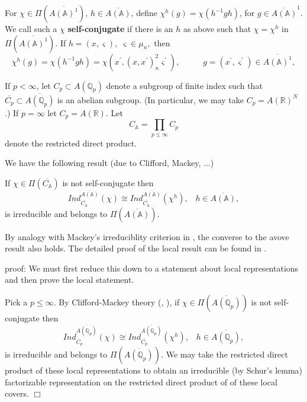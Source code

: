 For $\chi \in \Pi (\overline{A({\mathbb{A}})^1})$,
$h\in \overline{A({\mathbb{A}})}$, define
$\chi ^h(g)=\chi (h^{-1}gh)$, for $g\in 
\overline{A({\mathbb{A}})}^1$. We call such a
$\chi $ \textbf{self-conjugate} if
there is an $h$ as above such that $\chi =\chi ^h$
in $\Pi (\overline{A({\mathbb{A}})^1})$.
If $h=(x,\varsigma ),\;\varsigma \in \mu _n,$ then 
\[
\chi ^h(g)=\chi (h^{-1}gh)
=\chi (x^{\prime },(x,x^{\prime })_n^2\varsigma^{\prime }),
\;\;\;\;\;\;\;\;\;\;g=(x^{\prime },
\varsigma ^{\prime })\in \overline{A({\mathbb{A}})^1},
\]

If $p<\infty$, let $C_p\subset A({\mathbb{Q}}_p)$ denote a subgroup
of finite index such that
$\overline{C_p}\subset \overline{A({\mathbb{Q}}_p)}$ is
an abelian subgroup. (In particular, we may take
$C_p=A({\mathbb{R}})^N$.) If $p=\infty$ let $C_p=A({\mathbb{R}})$. Let
\begin{equation}\label{eq:3.7}
C_{{\mathbb{A}}}=\prod_{p\leq \infty }C_p
\end{equation}
denote the restricted direct product.

We have the following result (due to Clifford, Mackey,
...)

\begin{lemma}\label{lem:3.3}
If $\chi \in \Pi (\overline{C_{{\mathbb{A}}}})$ is not self-conjugate then 
\[
Ind_{\overline{C_{{\mathbb{A}}}}}^{\overline{A({\mathbb{A}})}}(\chi )
\cong Ind_{\overline{C_{{\mathbb{A}}}}}^{\overline{A({\mathbb{A}})}}(\chi ^h),
\;\;\;h\in  \overline{A({\mathbb{A}})},
\]
is irreducible and belongs to $\Pi (\overline{A({\mathbb{A}})})$.
\end{lemma}

\begin{remark}\label{rem:3.4} By analogy with Mackey's irreduciblity
criterion in \cite[\S 7.4]{Se}, the converse to the avove result also
holds. The detailed proof of the local result can be found in
\cite{J3}.
\end{remark}

\textsf{proof}: We must first reduce this down to a statement about local
representations and then prove the local statement.

Pick a $p\leq \infty $. By Clifford-Mackey theory (\cite{J3}, \cite[\S 7.4]{Se}),
if $\chi \in \Pi (\overline{A({\mathbb{Q}}_p)})$ is not self-conjugate then 
\begin{equation}\label{eq:3.8}
Ind_{\overline{C_p}}^{\overline{A({\mathbb{Q}}_p)}}(\chi )
\cong Ind_{\overline{C_p}}^{\overline{A({\mathbb{Q}}_p)}}(\chi ^h),
\;\;\;h\in \overline{A({\mathbb{Q}}_p)},
\end{equation}
is irreducible and belongs to $\Pi (\overline{A({\mathbb{Q}}_p)})$. We may take
the restricted direct product of these local representations to obtain an
irreducible (by Schur's lemma) factorizable representation on
the restricted direct product of of these local covers. $\Box $

